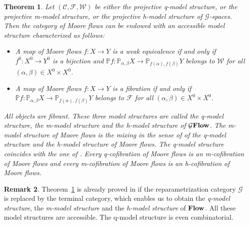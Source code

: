 \documentclass[a4paper,12pt]{amsart}
\newcommand{\C}{\mathcal{C}}
\newcommand{\W}{\mathcal{W}}
\newcommand{\F}{\mathcal{F}}
\newcommand{\p}{\times}
\renewcommand{\P}{\mathbb{P}}
\newtheorem{thm}{Theorem}[section]
\newcommand{\bth}{\begin{thm}}
\renewcommand{\eth}{\end{thm}}
\theoremstyle{definition}
\newtheorem{rem}[thm]{Remark}
\newcommand{\brm}[1]{{\rm{\mathbf{#1}}}}
\newcommand{\dtop}{{\brm{Flow}}}
\newcommand{\dtopG}{{\mathcal{G}\brm{Flow}}}
\renewcommand{\P}{\mathbb{P}}
\begin{document}
\bth \label{qhmMooreFlow}
Let $(\C,\F,\W)$ be either the projective q-model structure, or the projective m-model structure, or the projective h-model structure of $\mathcal{G}$-spaces. Then the category of Moore flows can be endowed with an accessible model structure characterized as follows: 
\begin{itemize}[leftmargin=*]
	\item A map of Moore flows $f:X\to Y$ is a weak equivalence if and only if $f^0:X^0\to Y^0$ is a bijection and $\P f:\P_{\alpha,\beta}X\to \P_{f(\alpha),f(\beta)}Y$ belongs to $\W$ for all $(\alpha,\beta)\in X^0\p X^0$.
	\item A map of Moore flows $f:X\to Y$ is a fibration if and only if $\P f:\P_{\alpha,\beta}X\to \P_{f(\alpha),f(\beta)}Y$ belongs to $\F$ for all $(\alpha,\beta)\in X^0\p X^0$.
\end{itemize}
All objects are fibrant. These three model structures are called the \textit{q-model structure}, the \textit{m-model structure} and the \textit{h-model structure} of $\dtopG$. The m-model structure of Moore flows is the mixing in the sense of \cite[Theorem~2.1]{mixed-cole} of the q-model structure and the h-model structure of Moore flows. The q-model structure coincides with the one of \cite[Theorem~8.8]{Moore1}. Every q-cofibration of Moore flows is an m-cofibration of Moore flows and every m-cofibration of Moore flows is an h-cofibration of Moore flows.  
\eth

\begin{rem}
	Theorem~\ref{qhmMooreFlow} is already proved in \cite[Theorem~7.4]{QHMmodel} if the reparametrization category $\mathcal{G}$ is replaced by the terminal category, which enables us to obtain the \textit{q-model structure}, the \textit{m-model structure} and the \textit{h-model structure} of $\dtop$. All these model structures are accessible. The q-model structure is even combinatorial.
\end{rem}
\end{document}
